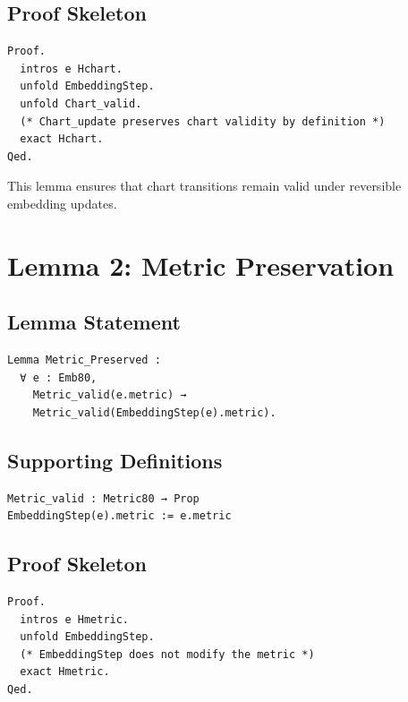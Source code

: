\documentclass[11pt]{article}
\begin{document}
\subsection{Proof Skeleton}

\begin{verbatim}
Proof.
  intros e Hchart.
  unfold EmbeddingStep.
  unfold Chart_valid.
  (* Chart_update preserves chart validity by definition *)
  exact Hchart.
Qed.
\end{verbatim}

This lemma ensures that chart transitions remain valid under reversible
embedding updates.

\newpage


\section{Lemma 2: Metric Preservation}

\subsection{Lemma Statement}

\begin{verbatim}
Lemma Metric_Preserved :
  ∀ e : Emb80,
    Metric_valid(e.metric) →
    Metric_valid(EmbeddingStep(e).metric).
\end{verbatim}

\subsection{Supporting Definitions}

\begin{verbatim}
Metric_valid : Metric80 → Prop
EmbeddingStep(e).metric := e.metric
\end{verbatim}

\subsection{Proof Skeleton}

\begin{verbatim}
Proof.
  intros e Hmetric.
  unfold EmbeddingStep.
  (* EmbeddingStep does not modify the metric *)
  exact Hmetric.
Qed.
\end{verbatim}
\end{document}
